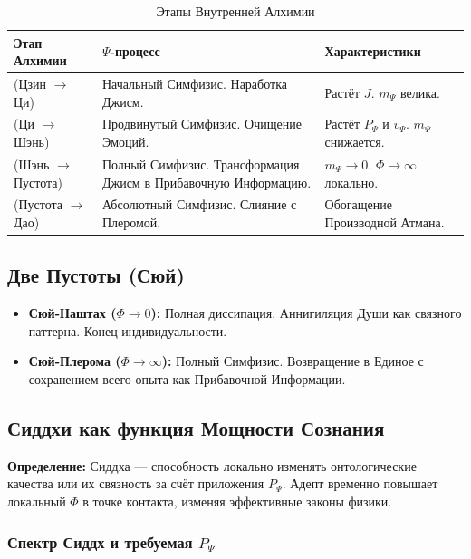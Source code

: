 \documentclass[a4paper,12pt]{article}
\begin{document}
\begin{table}[H]
	\centering
	\begin{tabular}{|p{4cm}|p{7cm}|p{4cm}|}
		\hline
		\textbf{Этап Алхимии} & \textbf{$\Psi$-процесс} & \textbf{Характеристики} \\
		\hline
		 (Цзин $\to$ Ци) & Начальный Симфизис. Наработка Джисм. & Растёт $J$. $m_{\Psi}$ велика. \\
		\hline
		 (Ци $\to$ Шэнь) & Продвинутый Симфизис. Очищение Эмоций. & Растёт $P_{\Psi}$ и $v_{\Psi}$. $m_{\Psi}$ снижается. \\
		\hline
		 (Шэнь $\to$ Пустота) & Полный Симфизис. Трансформация Джисм в Прибавочную Информацию. & $m_{\Psi} \to 0$. $\Phi \to \infty$ локально. \\
		\hline
		 (Пустота $\to$ Дао) & Абсолютный Симфизис. Слияние с Плеромой. & Обогащение Производной Атмана. \\
		\hline
	\end{tabular}
	\caption{Этапы Внутренней Алхимии}
\end{table}

\subsection{Две Пустоты (Сюй)}

\begin{itemize}
	\item \textbf{Сюй-Наштах ($\Phi \to 0$):} Полная диссипация. Аннигиляция Души как связного паттерна. Конец индивидуальности.
	\item \textbf{Сюй-Плерома ($\Phi \to \infty$):} Полный Симфизис. Возвращение в Единое с сохранением всего опыта как Прибавочной Информации.
\end{itemize}

\subsection{Сиддхи как функция Мощности Сознания}

\textbf{Определение:} Сиддха — способность локально изменять онтологические качества или их связность за счёт приложения $P_{\Psi}$. Адепт временно повышает локальный $\Phi$ в точке контакта, изменяя эффективные законы физики.

\subsubsection{Спектр Сиддх и требуемая $P_{\Psi}$}
\end{document}
